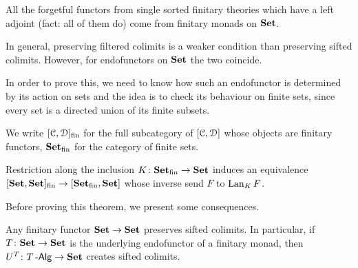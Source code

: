 \documentclass[a4paper,11pt,oneside,openany]{scrbook}
\begin{document}
\begin{exmp}
	All the forgetful functors from single sorted finitary theories which have a left adjoint (fact: all of them do) come from finitary monads on ${\normalfont\textbf{Set}}$.
\end{exmp}

	In general, preserving filtered colimits is a weaker condition than preserving sifted colimits. However, for endofunctors on ${\normalfont\textbf{Set}}$ the two coincide.

	In order to prove this, we need to know how such an endofunctor is determined by its action on sets and the idea is to check its behaviour on finite sets, since every set is a directed union of its finite subsets.
	
	We write $[\operatorname{\mathcal{C}},\operatorname{\mathcal{D}}]_\text{fin}$ for the full subcategory of $[\operatorname{\mathcal{C}},\operatorname{\mathcal{D}}]$ whose objects are finitary functors, ${\normalfont\textbf{Set}}_\text{fin}$ for the category of finite sets.
	
	\begin{thm}
		Restriction along the inclusion $K\colon{\normalfont\textbf{Set}}_\text{fin}\rightarrow{\normalfont\textbf{Set}}$ induces an equivalence $[{\normalfont\textbf{Set}},{\normalfont\textbf{Set}}]_\text{fin}\rightarrow[{\normalfont\textbf{Set}}_\text{fin},{\normalfont\textbf{Set}}]$ whose inverse send $F$ to $\operatorname{Lan}_KF$.
	\end{thm}

Before proving this theorem, we present some consequences.

\begin{cor}
	Any finitary functor ${\normalfont\textbf{Set}}\rightarrow{\normalfont\textbf{Set}}$ preserves sifted colimits. In particular, if $T\colon{\normalfont\textbf{Set}}\rightarrow{\normalfont\textbf{Set}}$ is the underlying endofunctor of a finitary monad, then $U^T\colon T\operatorname{-\mathsf{Alg}}\rightarrow{\normalfont\textbf{Set}}$ creates sifted colimits.
\end{cor}
\end{document}

